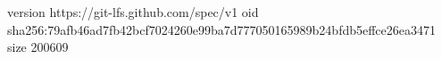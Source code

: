 version https://git-lfs.github.com/spec/v1
oid sha256:79afb46ad7fb42bcf7024260e99ba7d777050165989b24bfdb5effce26ea3471
size 200609
